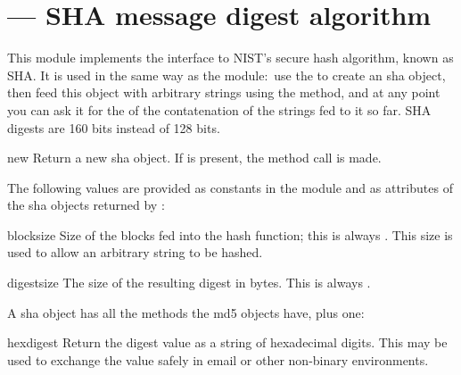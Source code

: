 \section{ ---
         SHA message digest algorithm}



This module implements the interface to NIST's secure hash 
algorithm, known as SHA.  It is used in
the same way as the  module:\ use the 
to create an sha object, then feed this object with arbitrary strings
using the  method, and at any point you can ask it
for the  of the contatenation of the strings fed to it
so far.  SHA digests are 160 bits instead of 128
bits.


\begin{funcdesc}{new}{}
  Return a new sha object.  If  is present, the method
  call  is made.
\end{funcdesc}


The following values are provided as constants in the module and as
attributes of the sha objects returned by :

\begin{datadesc}{blocksize}
  Size of the blocks fed into the hash function; this is always
  .  This size is used to allow an arbitrary string to be
  hashed.
\end{datadesc}

\begin{datadesc}{digestsize}
  The size of the resulting digest in bytes.  This is always
  .
\end{datadesc}


A sha object has all the methods the md5 objects have, plus one:

\begin{methoddesc}[sha]{hexdigest}{}
  Return the digest value as a string of hexadecimal digits.  This may 
  be used to exchange the value safely in email or other non-binary
  environments.
\end{methoddesc}


\begin{seealso}
\end{seealso}
